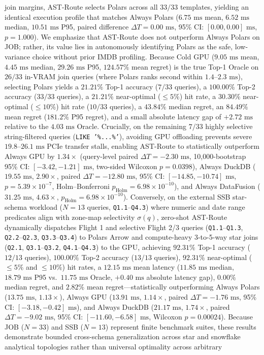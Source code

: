 \documentclass[10pt,a4paper]{article}
\begin{document}
\begin{enumerate}[leftmargin=1.5em,itemsep=2pt]
join margins, AST-Route selects Polars across all $33/33$ templates, yielding an identical execution profile that matches Always Polars ($6.75\text{ ms}$ mean, $6.52\text{ ms}$ median, $10.51\text{ ms}$ P95, paired difference $\Delta T = 0.00\text{ ms}$, 95\% CI: $[0.00, 0.00]\text{ ms}$, $p=1.000$). We emphasize that AST-Route does not outperform Always Polars on JOB; rather, its value lies in autonomously identifying Polars as the safe, low-variance choice without prior IMDB profiling. Because Cold GPU ($9.05\text{ ms}$ mean, $4.45\text{ ms}$ median, $29.26\text{ ms}$ P95, $124.57\%$ mean regret) is the true Top-1 Oracle on $26/33$ in-VRAM join queries (where Polars ranks second within $1.4\text{--}2.3\text{ ms}$), selecting Polars yields a $21.21\%$ Top-1 accuracy ($7/33$ queries), a $100.00\%$ Top-2 accuracy ($33/33$ queries), a $21.21\%$ near-optimal ($\le 5\%$) hit rate, a $30.30\%$ near-optimal ($\le 10\%$) hit rate ($10/33$ queries), a $43.84\%$ median regret, an $84.49\%$ mean regret ($181.2\%$ P95 regret), and a small absolute latency gap of $+2.72\text{ ms}$ relative to the $4.03\text{ ms}$ Oracle. Crucially, on the remaining $7/33$ highly selective string-filtered queries (\texttt{LIKE '\%...\%'}), avoiding GPU offloading prevents severe $19.8\text{--}26.1\text{ ms}$ PCIe transfer stalls, enabling AST-Route to statistically outperform Always GPU by $1.34\times$ (query-level paired $\Delta T = -2.30\text{ ms}$, 10,000-bootstrap 95\% CI: $[-3.42, -1.21]\text{ ms}$, two-sided Wilcoxon $p=0.0398$), Always DuckDB ($19.55\text{ ms}$, $2.90\times$, paired $\Delta T = -12.80\text{ ms}$, 95\% CI: $[-14.85, -10.74]\text{ ms}$, $p=5.39\times 10^{-7}$, Holm--Bonferroni $p_{\text{Holm}}=6.98\times 10^{-10}$), and Always DataFusion ($31.25\text{ ms}$, $4.63\times$, $p_{\text{Holm}}=6.98\times 10^{-10}$). Conversely, on the external SSB star-schema workload ($N=13$ queries, \texttt{Q1.1}--\texttt{Q4.3}) where numeric and date range predicates align with zone-map selectivity $\sigma(q)$, zero-shot AST-Route dynamically dispatches Flight 1 and selective Flight 2/3 queries (\texttt{Q1.1}--\texttt{Q1.3}, \texttt{Q2.2}--\texttt{Q2.3}, \texttt{Q3.3}--\texttt{Q3.4}) to Polars Arrow and compute-heavy 3-to-5-way star joins (\texttt{Q2.1}, \texttt{Q3.1}--\texttt{Q3.2}, \texttt{Q4.1}--\texttt{Q4.3}) to the GPU, achieving $92.31\%$ Top-1 accuracy ($12/13$ queries), $100.00\%$ Top-2 accuracy ($13/13$ queries), $92.31\%$ near-optimal ($\le 5\%$ and $\le 10\%$) hit rates, a $12.15\text{ ms}$ mean latency ($11.85\text{ ms}$ median, $18.79\text{ ms}$ P95 vs.\ $11.75\text{ ms}$ Oracle, $+0.40\text{ ms}$ absolute latency gap), $0.00\%$ median regret, and $2.82\%$ mean regret---statistically outperforming Always Polars ($13.75\text{ ms}$, $1.13\times$), Always GPU ($13.91\text{ ms}$, $1.14\times$, paired $\Delta T = -1.76\text{ ms}$, 95\% CI: $[-3.18, -0.42]\text{ ms}$), and Always DuckDB ($21.17\text{ ms}$, $1.74\times$, paired $\Delta T = -9.02\text{ ms}$, 95\% CI: $[-11.60, -6.58]\text{ ms}$, Wilcoxon $p=0.00024$). Because JOB ($N=33$) and SSB ($N=13$) represent finite benchmark suites, these results demonstrate bounded cross-schema generalization across star and snowflake analytical topologies rather than universal optimality across arbitrary 
\end{enumerate}
\end{document}
